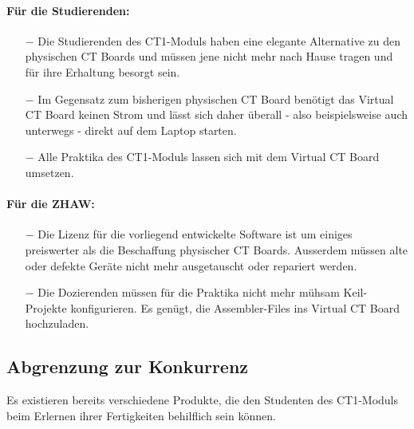\documentclass[10pt]{article}
\begin{document}
\paragraph{Für die Studierenden:}
\begin{itemize}
\item[$-$] Die Studierenden des CT1-Moduls haben eine elegante Alternative zu den physischen CT Boards und müssen jene nicht mehr nach Hause tragen und für ihre Erhaltung besorgt sein.
\item[$-$] Im Gegensatz zum bisherigen physischen CT Board benötigt das \glqq Virtual CT Board\grqq{} keinen Strom und lässt sich daher überall - also beispielsweise auch unterwegs - direkt auf dem Laptop starten.
\item[$-$] Alle Praktika des CT1-Moduls lassen sich mit dem \glqq Virtual CT Board\grqq{} umsetzen.
\end{itemize}

\paragraph{Für die ZHAW:}
\begin{itemize}
\item[$-$] Die Lizenz für die vorliegend entwickelte Software ist um einiges preiswerter als die Beschaffung physischer CT Boards. Ausserdem müssen alte oder defekte Geräte nicht mehr ausgetauscht oder repariert werden.
\item[$-$] Die Dozierenden müssen für die Praktika nicht mehr mühsam Keil-Projekte konfigurieren. Es genügt, die Assembler-Files ins \glqq Virtual CT Board\grqq{} hochzuladen.
\end{itemize}

\subsection{Abgrenzung zur Konkurrenz}

Es existieren bereits verschiedene Produkte, die den Studenten des CT1-Moduls beim Erlernen ihrer Fertigkeiten behilflich sein können.
\end{document}
